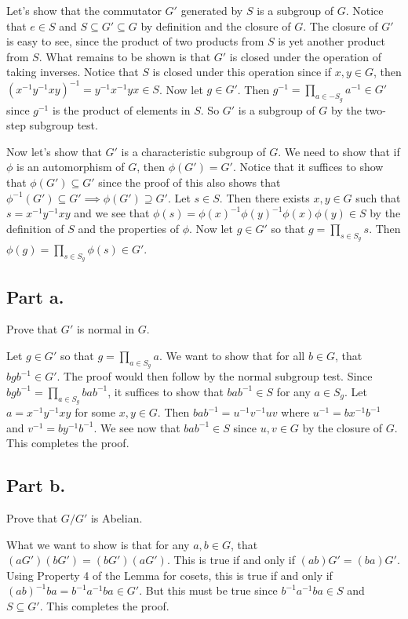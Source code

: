 \documentclass{article}
\begin{document}
Let's show that the commutator $G'$ generated by $S$ is
a subgroup of $G$.
Notice that $e\in S$ and $S\subseteq G'\subseteq G$ by definition and
the closure of $G$.
The closure of $G'$ is easy to see, since the product of two products
from $S$ is yet another product from $S$.  What remains to be shown is
that $G'$ is closed under the operation of taking inverses.  Notice
that $S$ is closed under this operation since if $x,y\in G$, then
$(x^{-1}y^{-1}xy)^{-1}=y^{-1}x^{-1}yx\in S$.  Now let $g\in G'$.
Then $g^{-1}=\prod_{a\in-S_g}a^{-1}\in G'$ since $g^{-1}$ is
the product of elements in $S$.  So $G'$ is a subgroup of $G$ by
the two-step subgroup test.

Now let's show that $G'$ is a characteristic subgroup of $G$.  We need to
show that if $\phi$ is an automorphism of $G$, then
$\phi(G')=G'$.  Notice that it suffices to show that $\phi(G')\subseteq G'$
since the proof of this also shows that
$\phi^{-1}(G')\subseteq G'\implies \phi(G')\supseteq G'$.
Let $s\in S$.  Then there exists $x,y\in G$ such that $s=x^{-1}y^{-1}xy$
and we see that $\phi(s)=\phi(x)^{-1}\phi(y)^{-1}\phi(x)\phi(y)\in S$ by
the definition of $S$ and the properties of $\phi$.
Now let $g\in G'$ so that $g=\prod_{s\in S_g}s$.
Then $\phi(g) = \prod_{s\in S_g}\phi(s)\in G'$.

\subsection*{Part a.}

Prove that $G'$ is normal in $G$.

Let $g\in G'$ so that $g=\prod_{a\in S_g}a$.
We want to show that for all $b\in G$, that $bgb^{-1}\in G'$.
The proof would then follow by the normal subgroup test.
Since $bgb^{-1}=\prod_{a\in S_g}bab^{-1}$, it suffices to show
that $bab^{-1}\in S$ for any $a\in S_g$.  Let $a=x^{-1}y^{-1}xy$ for some $x,y\in G$.
Then $bab^{-1} = u^{-1}v^{-1}uv$ where $u^{-1}=bx^{-1}b^{-1}$ and
$v^{-1}=by^{-1}b^{-1}$.  We see now that $bab^{-1}\in S$ since $u,v\in G$
by the closure of $G$.  This completes the proof.

\subsection*{Part b.}

Prove that $G/G'$ is Abelian.

What we want to show is that for any $a,b\in G$, that
$(aG')(bG') = (bG')(aG')$.  This is true if and only
if $(ab)G'=(ba)G'$.  Using Property 4 of the Lemma for cosets,
this is true if and only if $(ab)^{-1}ba=b^{-1}a^{-1}ba\in G'$.
But this must be true since $b^{-1}a^{-1}ba\in S$ and $S\subseteq G'$.
This completes the proof.
\end{document}
